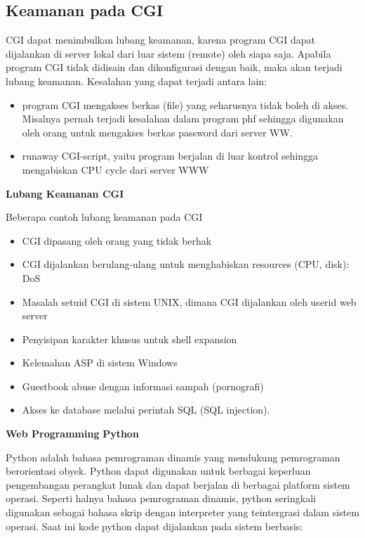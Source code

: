 \begin{enumerate}
\subsection{Keamanan pada CGI}
CGI dapat menimbulkan lubang keamanan, karena program CGI dapat dijalankan di server lokal dari luar sistem (remote) oleh siapa saja. Apabila program CGI tidak didisain dan dikonfigurasi dengan baik, maka akan terjadi lubang keamanan. Kesalahan yang dapat terjadi antara lain: \par
\begin{itemize}
	\item program CGI mengakses berkas (file) yang seharusnya tidak boleh di akses. Misalnya pernah terjadi kesalahan dalam program phf sehingga digunakan oleh orang untuk mengakses berkas password dari server WW.
	\item runaway CGI-script, yaitu program berjalan di luar kontrol sehingga mengabiskan CPU cycle dari server WWW\end{itemize}
\textbf{Lubang Keamanan CGI} \par
\noindent 
Beberapa contoh lubang keamanan pada CGI \par
\noindent 
\begin{itemize}
	\item CGI dipasang oleh orang yang tidak berhak \par
	\noindent 
	\item CGI dijalankan berulang-ulang untuk menghabiskan resources (CPU, disk): DoS \par
	\noindent 
	\item Masalah setuid CGI di sistem UNIX, dimana CGI dijalankan oleh userid web server \par
	\noindent 
	\item Penyisipan karakter khusus untuk shell expansion \par
	\noindent 
	\item Kelemahan ASP di sistem Windows \par
	\noindent 
	\item Guestbook abuse dengan informasi sampah (pornografi) \par
	\noindent 
	\item Akses ke database melalui perintah SQL (SQL injection).\end{itemize}
\par
\vspace{12pt}
\noindent 
\textbf{Web Programming }\textbf{Python} \par
Python adalah bahasa pemrograman dinamis yang mendukung pemrograman berorientasi obyek. Python dapat digunakan untuk berbagai keperluan pengembangan perangkat lunak dan dapat berjalan di berbagai platform sistem operasi. Seperti halnya bahasa pemrograman dinamis, python seringkali digunakan sebagai bahasa skrip dengan interpreter yang teintergrasi dalam sistem operasi. Saat ini kode python dapat dijalankan pada sistem berbasis: \par

\end{enumerate}
